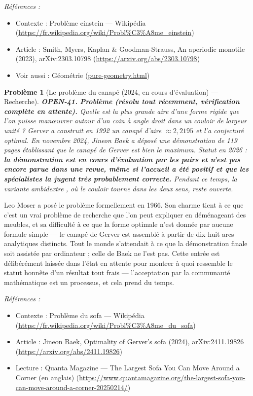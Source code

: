 \documentclass[11pt]{article}
\newtheorem{problem}{Problème}
\newenvironment{refs}{\par\small\noindent\emph{Références :}\begin{itemize}\setlength\itemsep{0pt}}{\end{itemize}\normalsize}
\begin{document}
\begin{refs}
\item Contexte : Problème einstein --- Wikipédia (\url{https://fr.wikipedia.org/wiki/Probl%C3%A8me_einstein})
\item Article : Smith, Myers, Kaplan \& Goodman-Strauss, \og{} An aperiodic monotile \fg{} (2023), arXiv:2303.10798 (\url{https://arxiv.org/abs/2303.10798})
\item Voir aussi : Géométrie (\url{pure-geometry.html})
\end{refs}

\bigskip

\begin{problem}[{Le problème du canapé (2024, en cours d'évaluation) --- Recherche}]
\textbf{OPEN-41.} \textbf{Problème (résolu tout récemment, vérification complète en
attente).} Quelle est la plus grande aire d'une forme rigide que l'on puisse man\oe{}uvrer
autour d'un coin à angle droit dans un couloir de largeur unité ? Gerver a construit en
1992 un canapé d'aire $ \approx 2{,}2195 $ et l'a conjecturé optimal. En novembre 2024,
Jineon Baek a déposé une démonstration de 119 pages établissant que le canapé de Gerver est
bien le maximum. Statut en 2026 : \textbf{la démonstration est en cours d'évaluation par les
pairs et n'est pas encore parue dans une revue, même si l'accueil a été positif et que les
spécialistes la jugent très probablement correcte.} Pendant ce temps, la variante
\og{} ambidextre \fg{}, où le couloir tourne dans les deux sens, reste ouverte.
\end{problem}

\noindent Leo Moser a posé le problème formellement en 1966. Son charme tient à ce
que c'est un vrai problème de recherche que l'on peut expliquer en déménageant des meubles,
et sa difficulté à ce que la forme optimale n'est donnée par aucune formule simple --- le
canapé de Gerver est assemblé à partir de dix-huit arcs analytiques distincts. Tout le monde
s'attendait à ce que la démonstration finale soit assistée par ordinateur ; celle de Baek ne
l'est pas. Cette entrée est délibérément laissée dans l'état \og{} en attente \fg{} pour montrer à
quoi ressemble le statut honnête d'un résultat tout frais --- l'acceptation par la communauté
mathématique est un processus, et cela prend du temps.

\begin{refs}
\item Contexte : Problème du sofa --- Wikipédia (\url{https://fr.wikipedia.org/wiki/Probl%C3%A8me_du_sofa})
\item Article : Jineon Baek, \og{} Optimality of Gerver's sofa \fg{} (2024), arXiv:2411.19826 (\url{https://arxiv.org/abs/2411.19826})
\item Lecture : Quanta Magazine --- The Largest Sofa You Can Move Around a Corner (en anglais) (\url{https://www.quantamagazine.org/the-largest-sofa-you-can-move-around-a-corner-20250214/})
\end{refs}
\end{document}
